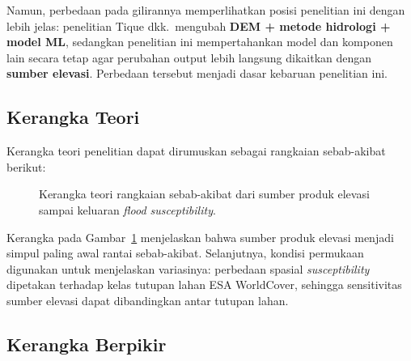 \documentclass[12pt]{article}
\begin{document}
Namun, perbedaan pada gilirannya memperlihatkan posisi penelitian ini dengan
lebih jelas: penelitian
Tique dkk.\ mengubah \textbf{DEM + metode hidrologi + model ML}, sedangkan
penelitian ini mempertahankan model dan komponen lain secara tetap agar
perubahan output lebih langsung dikaitkan dengan \textbf{sumber elevasi}.
Perbedaan tersebut menjadi dasar kebaruan penelitian ini.

\subsection{Kerangka Teori}

Kerangka teori penelitian dapat dirumuskan sebagai rangkaian sebab-akibat
berikut:

\begin{figure}[ht]
\centering
{}
\caption{Kerangka teori rangkaian sebab-akibat dari sumber produk elevasi
sampai keluaran \textit{flood susceptibility}.}
\label{fig:kerangka-teori}
\end{figure}

Kerangka pada Gambar~\ref{fig:kerangka-teori} menjelaskan bahwa sumber
produk elevasi menjadi simpul paling awal rantai sebab-akibat. Selanjutnya,
kondisi permukaan digunakan untuk menjelaskan variasinya: perbedaan
spasial \textit{susceptibility} dipetakan terhadap kelas tutupan lahan ESA
WorldCover, sehingga sensitivitas sumber elevasi dapat dibandingkan antar
tutupan lahan.

\subsection{Kerangka Berpikir}
\end{document}
